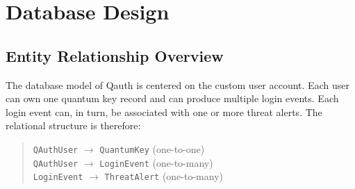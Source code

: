 \documentclass[12pt,a4paper]{report}
\begin{document}
\section{Database Design}

\subsection{Entity Relationship Overview}
The database model of Qauth is centered on the custom user account. Each user can own one quantum key record and can produce multiple login events. Each login event can, in turn, be associated with one or more threat alerts. The relational structure is therefore:

\begin{quote}
\noindent \texttt{QAuthUser} $\rightarrow$ \texttt{QuantumKey} (one-to-one) \\
\texttt{QAuthUser} $\rightarrow$ \texttt{LoginEvent} (one-to-many) \\
\texttt{LoginEvent} $\rightarrow$ \texttt{ThreatAlert} (one-to-many)
\end{quote}
\end{document}
